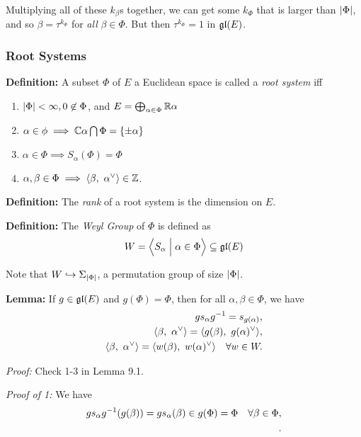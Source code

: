 Multiplying all of these \(k_\beta\)s together, we can get some
\(k_\Phi\) that is larger than \({\left\lvert {\Phi} \right\rvert}\), and so
\(\beta = \tau^{k_\Phi}\) for \emph{all} \(\beta \in \Phi\). But then
\(\tau^{k_\Phi} = 1\) in \({\mathfrak{gl}}(E)\).

\hypertarget{root-systems}{%
\subsubsection{Root Systems}\label{root-systems}}

\textbf{Definition:} A subset \(\Phi\) of \(E\) a Euclidean space is
called a \emph{root system} iff

\begin{enumerate}
\def\labelenumi{\arabic{enumi}.}
\tightlist
\item
  \({\left\lvert {\Phi} \right\rvert} < \infty, 0\not\in\Phi\), and
  \(E = \bigoplus_{\alpha\in\Phi} {\mathbb{R}} \alpha\)
\item
  \(\alpha \in \phi \implies {\mathbb{C}} \alpha \bigcap \Phi = \left\{{\pm \alpha}\right\}\)
\item
  \(\alpha \in \Phi \implies S_\alpha(\Phi) = \Phi\)
\item
  \(\alpha, \beta \in \Phi \implies {\left\langle {\beta},~{\alpha^\vee} \right\rangle} \in {\mathbb{Z}}\).
\end{enumerate}

\textbf{Definition:} The \emph{rank} of a root system is the dimension
on \(E\).

\textbf{Definition:} The \emph{Weyl Group} of \(\Phi\) is defined as \[
W = \left\langle{S_\alpha \mathrel{\Big|}\alpha \in \Phi}\right\rangle \subseteq {\mathfrak{gl}}(E)
\]

Note that \(W \hookrightarrow \Sigma_{{\left\lvert {\Phi} \right\rvert}}\), a permutation group of size
\({\left\lvert {\Phi} \right\rvert}\).

\textbf{Lemma:} If \(g \in {\mathfrak{gl}}(E)\) and \(g(\Phi) = \Phi\), then for
all \(\alpha, \beta \in \Phi\), we have \begin{align*}
g s_\alpha g^{-1} = s_{g(\alpha)}, \\
{\left\langle {\beta},~{\alpha^\vee} \right\rangle} = {\left\langle {g(\beta)},~{g(\alpha)^\vee} \right\rangle},\\
{\left\langle {\beta},~{\alpha^\vee} \right\rangle} = {\left\langle {w(\beta)},~{w(\alpha)^\vee} \right\rangle}\quad \forall w\in W
.\end{align*}

\emph{Proof:} Check 1-3 in Lemma 9.1.

\emph{Proof of 1:} We have \begin{align*}
g s_\alpha g^{-1}(g(\beta)) = g s_\alpha (\beta) \in g(\Phi) = \Phi \quad \forall \beta \in \Phi, \\
.\end{align*}

